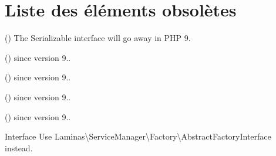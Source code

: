 \chapter{Liste des éléments obsolètes}
\hypertarget{deprecated}{}\label{deprecated}

\begin{DoxyRefList}
\item[\doxylink{report_8contract_8php_a77b973d137fb33212e018b042df6e3e7}{Global(e)} \doxylink{class_ramsey_1_1_collection_1_1_abstract_array_a4d9813fea8525b19a1d370eeb8fe41d6}{Abstract\+Array\+::serialize} ()]\label{deprecated__deprecated000104}%
%
The Serializable interface will go away in PHP 9. 
\item[\doxylink{report_8contract_8php_a77b973d137fb33212e018b042df6e3e7}{Global(e)} \doxylink{class_league_1_1_csv_1_1_abstract_csv_a7516ca30af0db3cdbf9a7739b48ce91d}{Abstract\+Csv\+::\+\_\+\+\_\+to\+String} ()]\label{deprecated__deprecated000086}%
%
since version 9..  
\item[\doxylink{report_8contract_8php_a77b973d137fb33212e018b042df6e3e7}{Global(e)} \doxylink{class_league_1_1_csv_1_1_abstract_csv_a58e43f09a06ce4e29b192c4e17ce7915}{Abstract\+Csv\+::get\+Content} ()]\label{deprecated__deprecated000087}%
%
since version 9..  
\item[\doxylink{report_8contract_8php_a77b973d137fb33212e018b042df6e3e7}{Global(e)} \doxylink{class_league_1_1_csv_1_1_abstract_csv_a3a7f24e49f7198b1d54d5e505033d1e5}{Abstract\+Csv\+::get\+Stream\+Filter\+Mode} ()]\label{deprecated__deprecated000084}%
%
since version 9..  
\item[\doxylink{report_8contract_8php_a77b973d137fb33212e018b042df6e3e7}{Global(e)} \doxylink{class_league_1_1_csv_1_1_abstract_csv_a6ddf5d9c57987a62abb0eb85680a5771}{Abstract\+Csv\+::supports\+Stream\+Filter} ()]\label{deprecated__deprecated000085}%
%
since version 9..  
\item[Interface \doxylink{interface_laminas_1_1_service_manager_1_1_abstract_factory_interface}{Abstract\+Factory\+Interface} ]\label{deprecated__deprecated000074}%
%
Use Laminas\textbackslash{}\+Service\+Manager\textbackslash{}\+Factory\textbackslash{}\+Abstract\+Factory\+Interface instead.  

\end{DoxyRefList}
